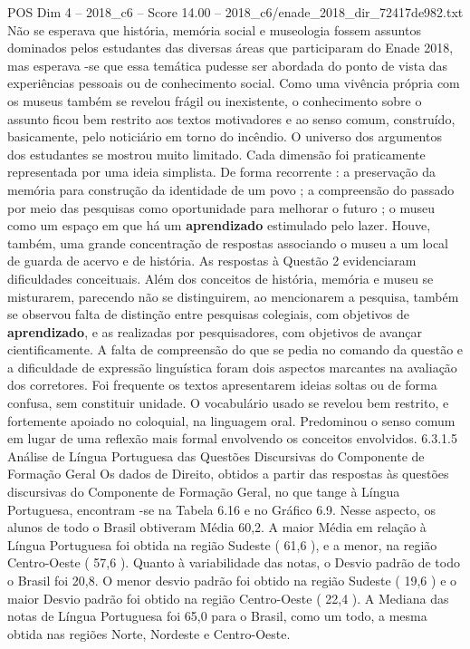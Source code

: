 \begin{textsample}{POS Dim 4 – 2018\_c6 – Score 14.00 – 2018\_c6/enade\_2018\_dir\_72417de982.txt}
Não se esperava que história, memória social e museologia fossem assuntos dominados pelos estudantes das diversas áreas que participaram do Enade 2018, mas esperava -se que essa temática pudesse ser abordada do ponto de vista das experiências pessoais ou de conhecimento social.
Como uma vivência própria com os museus também se revelou frágil ou inexistente, o conhecimento sobre o assunto ficou bem restrito aos textos motivadores e ao senso comum, construído, basicamente, pelo noticiário em torno do incêndio.
O universo dos argumentos dos estudantes se mostrou muito limitado.
Cada dimensão foi praticamente representada por uma ideia simplista.
De forma recorrente : a preservação da memória para construção da identidade de um povo ; a compreensão do passado por meio das pesquisas como oportunidade para melhorar o futuro ; o museu como um espaço em que há um \textbf{aprendizado} estimulado pelo lazer.
Houve, também, uma grande concentração de respostas associando o museu a um local de guarda de acervo e de história.
As respostas à Questão 2 evidenciaram dificuldades conceituais.
Além dos conceitos de história, memória e museu se misturarem, parecendo não se distinguirem, ao mencionarem a pesquisa, também se observou falta de distinção entre pesquisas colegiais, com objetivos de \textbf{aprendizado}, e as realizadas por pesquisadores, com objetivos de avançar cientificamente.
A falta de compreensão do que se pedia no comando da questão e a dificuldade de expressão linguística foram dois aspectos marcantes na avaliação dos corretores.
Foi frequente os textos apresentarem ideias soltas ou de forma confusa, sem constituir unidade.
O vocabulário usado se revelou bem restrito, e fortemente apoiado no coloquial, na linguagem oral.
Predominou o senso comum em lugar de uma reflexão mais formal envolvendo os conceitos envolvidos. 6.3.1.5 Análise de Língua Portuguesa das Questões Discursivas do Componente de Formação Geral Os dados de Direito, obtidos a partir das respostas às questões discursivas do Componente de Formação Geral, no que tange à Língua Portuguesa, encontram -se na Tabela 6.16 e no Gráfico 6.9.
Nesse aspecto, os alunos de todo o Brasil obtiveram Média 60,2.
A maior Média em relação à Língua Portuguesa foi obtida na região Sudeste ( 61,6 ), e a menor, na região Centro-Oeste ( 57,6 ).
Quanto à variabilidade das notas, o Desvio padrão de todo o Brasil foi 20,8.
O menor desvio padrão foi obtido na região Sudeste ( 19,6 ) e o maior Desvio padrão foi obtido na região Centro-Oeste ( 22,4 ).
A Mediana das notas de Língua Portuguesa foi 65,0 para o Brasil, como um todo, a mesma obtida nas regiões Norte, Nordeste e Centro-Oeste.

\end{textsample}
